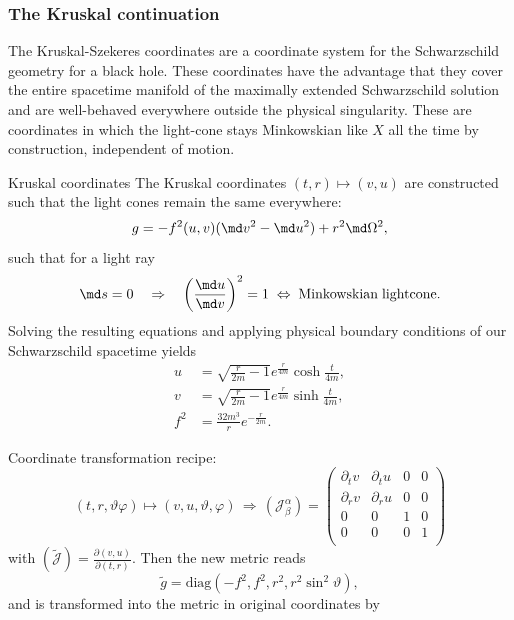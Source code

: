\subsubsection{The Kruskal continuation}
The Kruskal-Szekeres coordinates are a coordinate system for the Schwarzschild geometry for a black hole. These coordinates have the advantage that they cover the entire spacetime manifold of the maximally extended Schwarzschild solution and are well-behaved everywhere outside the physical singularity. These are coordinates in which the light-cone stays Minkowskian like $X$ all the time by construction, independent of motion.
\begin{mybox}{Kruskal coordinates}
	The Kruskal coordinates $(t,r) \mapsto (v,u)$ are constructed such that the light cones remain the same everywhere:
	\begin{equation}
		g = -f^2(u,v) (\md v^2 -\md u^2) + r^2 \md \Omega^2,
	\end{equation}
	such that for a light ray
	\begin{equation}
		\md s= 0 \quad \Rightarrow \quad \left(\frac{\md u}{\md v}\right)^2 =1 \; \Leftrightarrow \; \mathrm{Minkowskian \; lightcone.}
	\end{equation}
	Solving the resulting equations and applying physical boundary conditions of our Schwarzschild spacetime yields
	\begin{align}
		u &= \sqrt{\frac{r}{2m} -1 } e^{\frac{r}{4m}} \cosh{\frac{t}{4m}}, \\
		v &= \sqrt{\frac{r}{2m} -1} e^{\frac{r}{4m}} \sinh{\frac{t}{4m}}, \\
		f^2 &= \frac{32 m^3}{r} e^{- \frac{r}{2m}}.
	\end{align}
\end{mybox}
Coordinate transformation recipe:\\
\begin{equation}
	(t,r,\vartheta\varphi) \mapsto (v,u,\vartheta,\varphi) \, \Rightarrow \, (\mathcal{J}^{\alpha}_{\beta}) = \begin{pmatrix}
	\partial_t v & \partial_tu & 0&0\\
	\partial_r v & \partial_r u &0&0 \\
	0&0&1&0\\
	0&0&0&1\\
	\end{pmatrix}
\end{equation}
with $(\tilde{\mathcal{J}} ) = \frac{\partial(v,u)}{\partial (t,r)}$. Then the new metric reads
\begin{equation}
	\tilde{g} = \mathrm{diag}\left(-f^2,f^2,r^2,r^2 \sin^2\vartheta\right),
\end{equation}
and is transformed into the metric in original coordinates by

